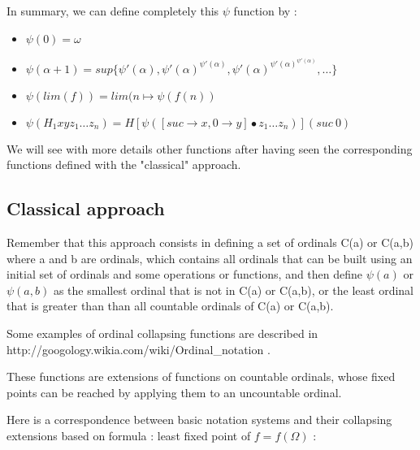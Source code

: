 \documentclass[10pt]{article}
\begin{document}
\bigskip

In summary, we can define completely this \( \psi \) function by :

\begin{itemize}
     \setlength{\itemsep}{1pt}
     \setlength{\parskip}{0pt}
     \setlength{\parsep}{0pt}

\item \( \psi(0) = \omega \)

\item \( \psi(\alpha+1) = sup \lbrace \psi'(\alpha), \psi'(\alpha)^{\psi'(\alpha)}, \psi'(\alpha)^{\psi'(\alpha)^{\psi'(\alpha)}}, \ldots \rbrace \)

\item  \( \psi(lim(f)) = lim(n \mapsto \psi(f(n)) \)

\item \( \psi (H_1 x y z_1 \ldots z_n) = H [\psi([suc \rightarrow x, 0 \rightarrow y] \bullet z_1 \ldots z_n)] (suc\ 0) \)

\end{itemize}

\bigskip

We will see with more details other functions after having seen the corresponding functions defined with the "classical" approach.

\subsection{Classical approach}

Remember that this approach consists in defining a set of ordinals C(a) or C(a,b) where a and b are ordinals, which contains all ordinals that can be built using an initial set of ordinals and some operations or functions, and then define \( \psi(a) \) or \( \psi(a,b) \) as the smallest ordinal that is not in C(a) or C(a,b), or the least ordinal that is greater than than all countable ordinals of C(a) or C(a,b).

Some examples of ordinal collapsing functions are described in http://googology.wikia.com/wiki/Ordinal\_notation .

These functions are extensions of functions on countable ordinals, whose fixed points can be reached by applying them to an uncountable ordinal.

Here is a correspondence between basic notation systems and their collapsing extensions based on formula : least fixed point of \( f = f(\Omega) \) :

\bigskip
\end{document}
